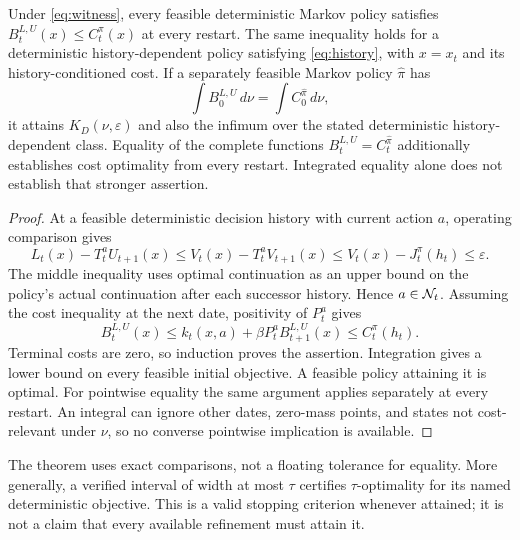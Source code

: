 \begin{theorem}\label{thm:outer}
Under \eqref{eq:witness}, every feasible deterministic Markov policy satisfies $B_t^{L,U}(x)\leq C_t^\pi(x)$ at every restart. The same inequality holds for a deterministic history-dependent policy satisfying \eqref{eq:history}, with $x=x_t$ and its history-conditioned cost. If a separately feasible Markov policy $\widehat\pi$ has
\begin{equation}\label{eq:equality}
 \int B_0^{L,U}\,d\nu=\int C_0^{\widehat\pi}\,d\nu,
\end{equation}
it attains $K_D(\nu,\varepsilon)$ and also the infimum over the stated deterministic history-dependent class. Equality of the complete functions $B_t^{L,U}=C_t^{\widehat\pi}$ additionally establishes cost optimality from every restart. Integrated equality alone does not establish that stronger assertion.
\end{theorem}
\begin{proof}
At a feasible deterministic decision history with current action $a$, operating comparison gives
\[
 L_t(x)-T_t^aU_{t+1}(x)
 \leq V_t(x)-T_t^aV_{t+1}(x)
 \leq V_t(x)-J_t^\pi(h_t)\leq\varepsilon.
\]
The middle inequality uses optimal continuation as an upper bound on the policy's actual continuation after each successor history. Hence $a\in\mathcal N_t$. Assuming the cost inequality at the next date, positivity of $P_t^a$ gives
\[
 B_t^{L,U}(x)\leq k_t(x,a)+\beta P_t^aB_{t+1}^{L,U}(x)
 \leq C_t^\pi(h_t).
\]
Terminal costs are zero, so induction proves the assertion. Integration gives a lower bound on every feasible initial objective. A feasible policy attaining it is optimal. For pointwise equality the same argument applies separately at every restart. An integral can ignore other dates, zero-mass points, and states not cost-relevant under $\nu$, so no converse pointwise implication is available.\end{proof}

The theorem uses exact comparisons, not a floating tolerance for equality. More generally, a verified interval of width at most $\tau$ certifies $\tau$-optimality for its named deterministic objective. This is a valid stopping criterion whenever attained; it is not a claim that every available refinement must attain it.

